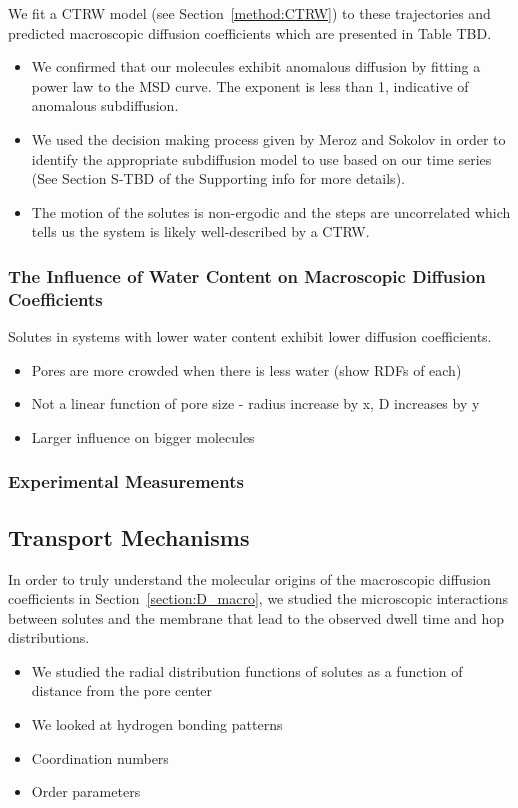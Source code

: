 \documentclass{article}
\begin{document}

  We fit a CTRW model (see Section~\ref{method:CTRW}) to these 
  trajectories and predicted macroscopic diffusion coefficients which are
  presented in Table TBD.
  \begin{itemize}
	\item We confirmed that our molecules exhibit anomalous diffusion
	by fitting a power law to the MSD curve. The exponent is less than
	1, indicative of anomalous subdiffusion.
	\item We used the decision making process given by Meroz and Sokolov
	in order to identify the appropriate subdiffusion model to use 
	based on our time series (See Section S-TBD of the Supporting info for
	more details).
	\item The motion of the solutes is non-ergodic and the steps are
	uncorrelated which tells us the system is likely well-described
	by a CTRW. 
  \end{itemize}


  \subsubsection*{The Influence of Water Content on Macroscopic Diffusion Coefficients}

  Solutes in systems with lower water content exhibit lower diffusion coefficients.
  \begin{itemize}
	\item Pores are more crowded when there is less water (show RDFs of each)
	\item Not a linear function of pore size - radius increase by x, D increases by y
	\item Larger influence on bigger molecules
  \end{itemize}

  \subsubsection{Experimental Measurements}


  \subsection{Transport Mechanisms}

  In order to truly understand the molecular origins of the macroscopic
  diffusion coefficients in Section~\ref{section:D_macro}, we studied the
  microscopic interactions between solutes and the membrane that lead to the
  observed dwell time and hop distributions.
  \begin{itemize}
	\item We studied the radial distribution functions of solutes as a
	function of distance from the pore center
	\item We looked at hydrogen bonding patterns
	\item Coordination numbers
	\item Order parameters
  \end{itemize}
\end{document}
